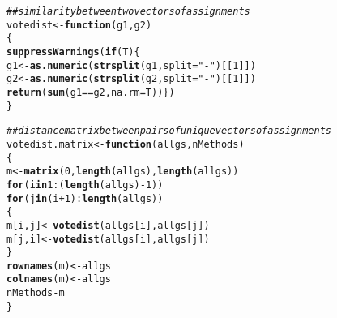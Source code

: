 \documentclass{article}\usepackage[]{graphicx}\usepackage[]{color}
\makeatletter
\newcommand{\hlnum}[1]{\textcolor[rgb]{0.686,0.059,0.569}{#1}}%
\newcommand{\hlstr}[1]{\textcolor[rgb]{0.192,0.494,0.8}{#1}}%
\newcommand{\hlcom}[1]{\textcolor[rgb]{0.678,0.584,0.686}{\textit{#1}}}%
\newcommand{\hlopt}[1]{\textcolor[rgb]{0,0,0}{#1}}%
\newcommand{\hlstd}[1]{\textcolor[rgb]{0.345,0.345,0.345}{#1}}%
\newcommand{\hlkwa}[1]{\textcolor[rgb]{0.161,0.373,0.58}{\textbf{#1}}}%
\newcommand{\hlkwb}[1]{\textcolor[rgb]{0.69,0.353,0.396}{#1}}%
\newcommand{\hlkwc}[1]{\textcolor[rgb]{0.333,0.667,0.333}{#1}}%
\newcommand{\hlkwd}[1]{\textcolor[rgb]{0.737,0.353,0.396}{\textbf{#1}}}%
\newenvironment{kframe}{%
 \def\at@end@of@kframe{}%
 \ifinner\ifhmode%
  \def\at@end@of@kframe{\end{minipage}}%
  \begin{minipage}{\columnwidth}%
 \fi\fi%
 \def\FrameCommand##1{\hskip\@totalleftmargin \hskip-\fboxsep
 \colorbox{shadecolor}{##1}\hskip-\fboxsep
     \hskip-\linewidth \hskip-\@totalleftmargin \hskip\columnwidth}%
 \MakeFramed {\advance\hsize-\width
   \@totalleftmargin\z@ \linewidth\hsize
   \@setminipage}}%
 {\par\unskip\endMakeFramed%
 \at@end@of@kframe}
\newenvironment{knitrout}{}{} %
\makeatother
\begin{document}
\begin{knitrout}\scriptsize
{}\color{fgcolor}\begin{kframe}
\begin{alltt}
\hlcom{## similarity between two vectors of assignments}
\hlstd{votedist} \hlkwb{<-} \hlkwa{function}\hlstd{(}\hlkwc{g1}\hlstd{,}\hlkwc{g2}\hlstd{)}
\hlstd{\{}
    \hlkwd{suppressWarnings}\hlstd{(}\hlkwa{if}\hlstd{(T)\{}
    \hlstd{g1} \hlkwb{<-} \hlkwd{as.numeric}\hlstd{(}\hlkwd{strsplit}\hlstd{(g1,}\hlkwc{split}\hlstd{=}\hlstr{"-"}\hlstd{)[[}\hlnum{1}\hlstd{]])}
    \hlstd{g2} \hlkwb{<-} \hlkwd{as.numeric}\hlstd{(}\hlkwd{strsplit}\hlstd{(g2,}\hlkwc{split}\hlstd{=}\hlstr{"-"}\hlstd{)[[}\hlnum{1}\hlstd{]])}
    \hlkwd{return}\hlstd{(}\hlkwd{sum}\hlstd{(g1}\hlopt{==}\hlstd{g2,}\hlkwc{na.rm}\hlstd{=T))\})}
\hlstd{\}}

\hlcom{## distance matrix between pairs of unique vectors of assignments}
\hlstd{votedist.matrix} \hlkwb{<-} \hlkwa{function}\hlstd{(}\hlkwc{allgs}\hlstd{,}\hlkwc{nMethods}\hlstd{)}
\hlstd{\{}
    \hlstd{m} \hlkwb{<-} \hlkwd{matrix}\hlstd{(}\hlnum{0}\hlstd{,}\hlkwd{length}\hlstd{(allgs),}\hlkwd{length}\hlstd{(allgs))}
    \hlkwa{for}\hlstd{(i} \hlkwa{in} \hlnum{1}\hlopt{:}\hlstd{(}\hlkwd{length}\hlstd{(allgs)}\hlopt{-}\hlnum{1}\hlstd{))}
        \hlkwa{for}\hlstd{(j} \hlkwa{in} \hlstd{(i}\hlopt{+}\hlnum{1}\hlstd{)}\hlopt{:}\hlkwd{length}\hlstd{(allgs))}
        \hlstd{\{}
            \hlstd{m[i,j]} \hlkwb{<-} \hlkwd{votedist}\hlstd{(allgs[i],allgs[j])}
            \hlstd{m[j,i]} \hlkwb{<-} \hlkwd{votedist}\hlstd{(allgs[i],allgs[j])}
        \hlstd{\}}
    \hlkwd{rownames}\hlstd{(m)} \hlkwb{<-} \hlstd{allgs}
    \hlkwd{colnames}\hlstd{(m)} \hlkwb{<-} \hlstd{allgs}
    \hlstd{nMethods}\hlopt{-}\hlstd{m}
\hlstd{\}}


\end{alltt}
\end{kframe}
\end{knitrout}
\end{document}
